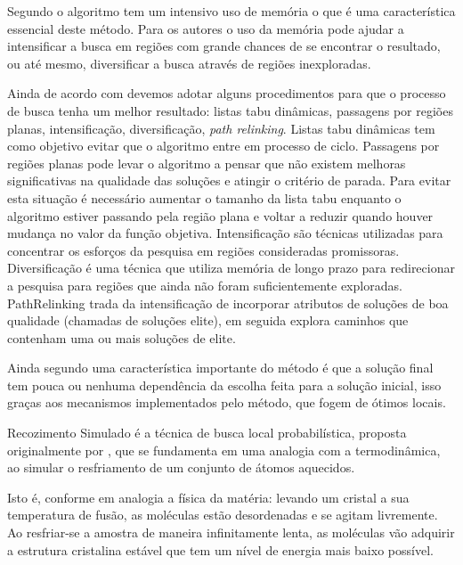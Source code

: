 Segundo \cite{armentanointroduccao}  o algoritmo tem um intensivo uso de memória o que é uma característica essencial deste método. Para os autores o uso da memória pode ajudar a intensificar a busca em regiões com grande chances de se encontrar o resultado, ou até mesmo, diversificar a busca através de regiões inexploradas.

Ainda de acordo com \cite{armentanointroduccao}  devemos adotar alguns procedimentos para que o processo de busca tenha um melhor resultado: listas tabu dinâmicas, passagens por regiões planas, intensificação, diversificação, \textit{path relinking}. Listas tabu dinâmicas tem como objetivo evitar que o algoritmo entre em processo de ciclo. Passagens por regiões planas pode levar o algoritmo a pensar que não existem melhoras significativas na qualidade das soluções e atingir o critério de parada. Para evitar esta situação é necessário aumentar o tamanho da lista tabu enquanto o algoritmo estiver passando pela região plana e voltar a reduzir quando houver mudança no valor da função objetiva. Intensificação são técnicas utilizadas para concentrar os esforços da pesquisa em regiões consideradas promissoras. Diversificação é uma técnica que utiliza memória de longo prazo para redirecionar a pesquisa para regiões que ainda não foram suficientemente exploradas. PathRelinking trada da intensificação de incorporar atributos de soluções de boa qualidade (chamadas de soluções elite), em seguida explora caminhos que contenham uma ou mais soluções de elite.

Ainda segundo \cite{armentanointroduccao} uma característica importante do método é que a solução final tem pouca ou nenhuma dependência da escolha feita para a solução inicial, isso graças aos mecanismos implementados pelo método, que fogem de ótimos locais.


Recozimento Simulado é a técnica de busca local probabilística, proposta originalmente por \cite{kirkpatrick1983optimization}, que se fundamenta em uma analogia com a termodinâmica, ao simular o 
resfriamento de um conjunto de átomos aquecidos.\par 

Isto é, conforme \cite{noronha2003abordagem} em analogia a física da matéria: levando um cristal a sua temperatura de fusão, as moléculas estão desordenadas e se agitam livremente. Ao resfriar-se a amostra de maneira infinitamente lenta, as moléculas vão adquirir a estrutura cristalina estável que tem um nível de energia mais baixo possível.\par 

